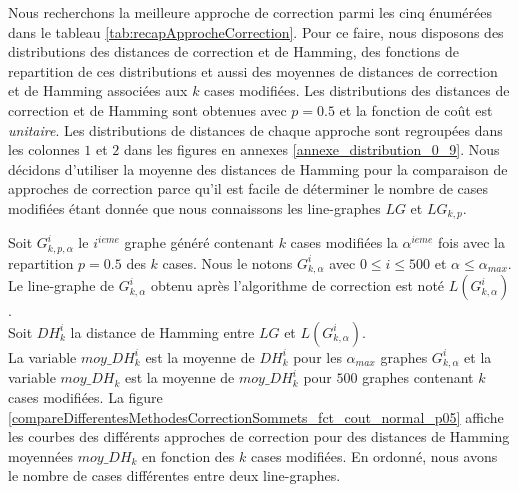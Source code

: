 
Nous recherchons la meilleure approche de correction parmi les cinq  \'enum\'er\'ees dans le tableau \ref{tab:recapApprocheCorrection}.
Pour ce faire, nous disposons des distributions des distances de correction et de Hamming, des fonctions de repartition de ces distributions et aussi des moyennes de distances de correction et de Hamming associ\'ees aux $k$ cases modifi\'ees. Les distributions des distances de correction et de Hamming sont obtenues avec  $p=0.5$ et la fonction de co\^ut est {\em unitaire}.
Les distributions de distances de chaque approche sont regroup\'ees dans les colonnes $1$ et $2$ dans les figures en annexes \ref{annexe_distribution_0_9}.
Nous d\'ecidons d'utiliser la moyenne des distances de Hamming pour la comparaison de approches de correction parce qu'il est facile de d\'eterminer le nombre de cases modifi\'ees \'etant donn\'ee que nous connaissons les line-graphes $LG$ et $LG_{k,p}$. 
\newline

%
Soit $G_{k,p,\alpha}^{i}$  le $i^{ieme}$  graphe g\'en\'er\'e contenant $k$ cases modifi\'ees la $\alpha^{ieme}$ fois avec la repartition $p=0.5$ des $k$ cases. Nous le notons $G_{k,\alpha}^{i}$ avec $ 0 \le i \le 500$ et $\alpha \le \alpha_{max}$. Le line-graphe de  $G_{k,\alpha}^{i}$ obtenu apr\`es l'algorithme de correction est not\'e $L(G_{k,\alpha}^{i})$. \\
Soit $DH_k^i$ la distance de Hamming entre $LG$ et $L(G_{k,\alpha}^{i})$.  \\
La variable $moy\_DH_{k}^{i}$ est la moyenne de $DH_k^i$ pour les $\alpha_{max}$ graphes $G_{k,\alpha}^{i}$ et la variable $moy\_DH_{k}$ est la moyenne de $moy\_DH_{k}^{i}$ pour $500$ graphes contenant $k$ cases modifi\'ees.
La figure \ref{compareDifferentesMethodesCorrectionSommets_fct_cout_normal_p05} affiche les courbes  des diff\'erents approches de correction pour des distances de Hamming moyenn\'ees $moy\_DH_{k}$ en fonction des $k$ cases modifi\'ees. En ordonn\'e, nous avons le nombre de cases diff\'erentes entre deux line-graphes. 
\newline

